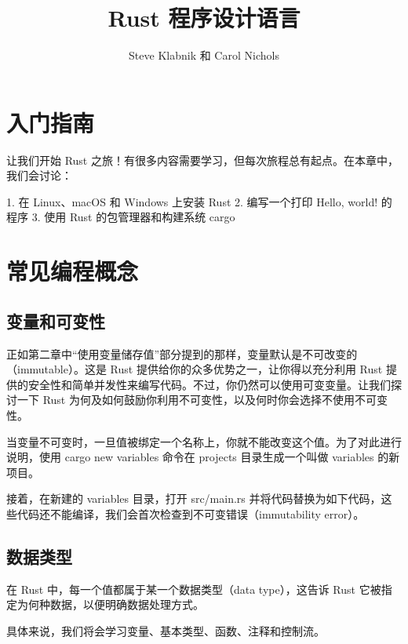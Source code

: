 \documentclass[]{article}
\title{Rust 程序设计语言}
\author{Steve Klabnik 和 Carol Nichols}
\begin{document}
\maketitle

\section{入门指南}
	让我们开始 Rust 之旅！有很多内容需要学习，但每次旅程总有起点。在本章中，我们会讨论：
	
	1. 在 Linux、macOS 和 Windows 上安装 Rust
	2. 编写一个打印 Hello, world! 的程序
	3. 使用 Rust 的包管理器和构建系统 cargo
\section{常见编程概念}
	\subsection{变量和可变性}
	正如第二章中“使用变量储存值”部分提到的那样，变量默认是不可改变的（immutable）。这是 Rust 提供给你的众多优势之一，让你得以充分利用 Rust 提供的安全性和简单并发性来编写代码。不过，你仍然可以使用可变变量。让我们探讨一下 Rust 为何及如何鼓励你利用不可变性，以及何时你会选择不使用不可变性。
	
	当变量不可变时，一旦值被绑定一个名称上，你就不能改变这个值。为了对此进行说明，使用 cargo new variables 命令在 projects 目录生成一个叫做 variables 的新项目。

	接着，在新建的 variables 目录，打开 src/main.rs 并将代码替换为如下代码，这些代码还不能编译，我们会首次检查到不可变错误（immutability error）。

	\subsection{数据类型}
	在 Rust 中，每一个值都属于某一个数据类型（data type），这告诉 Rust 它被指定为何种数据，以便明确数据处理方式。
	
具体来说，我们将会学习变量、基本类型、函数、注释和控制流。
\end{document}
